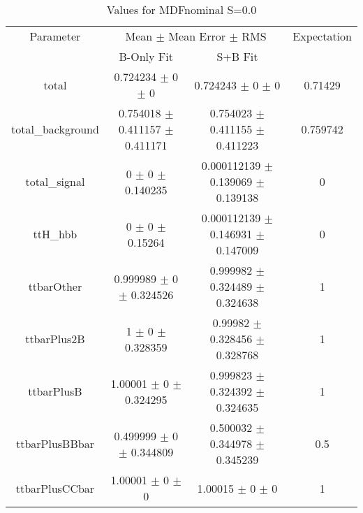 \begin{table}
\centering
\caption{Values for MDFnominal S=0.0}
\begin{tabular}{cccc}
\toprule
Parameter & \multicolumn{2}{c}{Mean $\pm$ Mean Error $\pm$ RMS} & Expectation\\
 & B-Only Fit & S+B Fit & \\
\midrule
total & \num{0.724234} $\pm$ \num{0} $\pm$ \num{0} & \num{0.724243} $\pm$ \num{0} $\pm$ \num{0} & \num{0.71429}\\
total\_background & \num{0.754018} $\pm$ \num{0.411157} $\pm$ \num{0.411171} & \num{0.754023} $\pm$ \num{0.411155} $\pm$ \num{0.411223} & \num{0.759742}\\
total\_signal & \num{0} $\pm$ \num{0} $\pm$ \num{0.140235} & \num{0.000112139} $\pm$ \num{0.139069} $\pm$ \num{0.139138} & \num{0}\\
ttH\_hbb & \num{0} $\pm$ \num{0} $\pm$ \num{0.15264} & \num{0.000112139} $\pm$ \num{0.146931} $\pm$ \num{0.147009} & \num{0}\\
ttbarOther & \num{0.999989} $\pm$ \num{0} $\pm$ \num{0.324526} & \num{0.999982} $\pm$ \num{0.324489} $\pm$ \num{0.324638} & \num{1}\\
ttbarPlus2B & \num{1} $\pm$ \num{0} $\pm$ \num{0.328359} & \num{0.99982} $\pm$ \num{0.328456} $\pm$ \num{0.328768} & \num{1}\\
ttbarPlusB & \num{1.00001} $\pm$ \num{0} $\pm$ \num{0.324295} & \num{0.999823} $\pm$ \num{0.324392} $\pm$ \num{0.324635} & \num{1}\\
ttbarPlusBBbar & \num{0.499999} $\pm$ \num{0} $\pm$ \num{0.344809} & \num{0.500032} $\pm$ \num{0.344978} $\pm$ \num{0.345239} & \num{0.5}\\
ttbarPlusCCbar & \num{1.00001} $\pm$ \num{0} $\pm$ \num{0} & \num{1.00015} $\pm$ \num{0} $\pm$ \num{0} & \num{1}\\
\bottomrule
\end{tabular}
\end{table}
